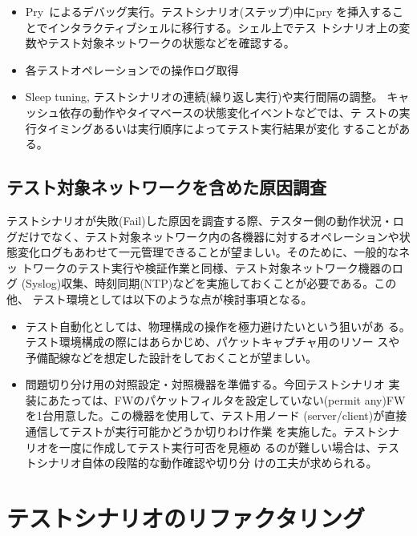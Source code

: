 \begin{itemize}
 \item Pry~\cite{pry}によるデバッグ実行。テストシナリオ(ステップ)中にpry
       を挿入することでインタラクティブシェルに移行する。シェル上でテス
       トシナリオ上の変数やテスト対象ネットワークの状態などを確認する。
 \item 各テストオペレーションでの操作ログ取得
 \item Sleep tuning, テストシナリオの連続(繰り返し実行)や実行間隔の調整。
       キャッシュ依存の動作やタイマベースの状態変化イベントなどでは、テ
       ストの実行タイミングあるいは実行順序によってテスト実行結果が変化
       することがある。
\end{itemize}

  \subsection{テスト対象ネットワークを含めた原因調査}

テストシナリオが失敗(Fail)した原因を調査する際、テスター側の動作状況・ロ
グだけでなく、テスト対象ネットワーク内の各機器に対するオペレーションや状
態変化ログもあわせて一元管理できることが望ましい。そのために、一般的なネッ
トワークのテスト実行や検証作業と同様、テスト対象ネットワーク機器のログ
(Syslog)収集、時刻同期(NTP)などを実施しておくことが必要である。この他、
テスト環境としては以下のような点が検討事項となる。
\begin{itemize}
 \item テスト自動化としては、物理構成の操作を極力避けたいという狙いがあ
       る。テスト環境構成の際にはあらかじめ、パケットキャプチャ用のリソー
       スや予備配線などを想定した設計をしておくことが望ましい。
 \item 問題切り分け用の対照設定・対照機器を準備する。今回テストシナリオ
       実装にあたっては、FWのパケットフィルタを設定していない(permit
       any)FWを1台用意した。この機器を使用して、テスト用ノード
       (server/client)が直接通信してテストが実行可能かどうか切りわけ作業
       を実施した。テストシナリオを一度に作成してテスト実行可否を見極め
       るのが難しい場合は、テストシナリオ自体の段階的な動作確認や切り分
       けの工夫が求められる。
\end{itemize}

 \section{テストシナリオのリファクタリング}

